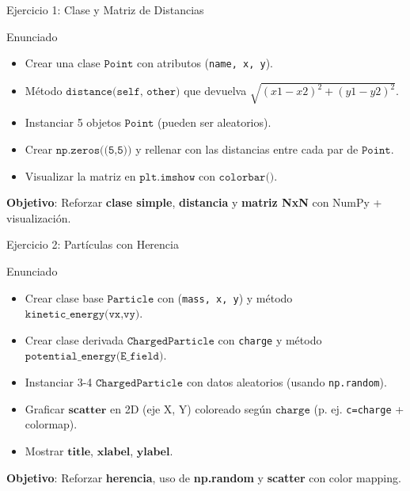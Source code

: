 \documentclass[10pt]{beamer}
\begin{document}
\begin{frame}{Ejercicio 1: Clase y Matriz de Distancias}
  \begin{block}{Enunciado}
    \begin{itemize}
      \item Crear una clase \(\texttt{Point}\) con atributos (\texttt{name, x, y}).
      \item Método \(\texttt{distance(self, other)}\) que devuelva \(\sqrt{(x1-x2)^2 + (y1-y2)^2}\).
      \item Instanciar 5 objetos \(\texttt{Point}\) (pueden ser aleatorios).
      \item Crear \(\texttt{np.zeros((5,5))}\) y rellenar con las distancias entre cada par de \(\texttt{Point}\).
      \item Visualizar la matriz en \(\texttt{plt.imshow}\) con \(\texttt{colorbar()}\).
    \end{itemize}
  \end{block}
  \textbf{Objetivo}: Reforzar \textbf{clase simple}, \textbf{distancia} y \textbf{matriz NxN} con NumPy + visualización.
\end{frame}

\begin{frame}{Ejercicio 2: Partículas con Herencia}
  \begin{block}{Enunciado}
    \begin{itemize}
      \item Crear clase base \(\texttt{Particle}\) con (\texttt{mass, x, y}) y método \(\texttt{kinetic\_energy(vx,vy)}\).
      \item Crear clase derivada \(\texttt{ChargedParticle}\) con \texttt{charge} y método \(\texttt{potential\_energy(E\_field)}\).
      \item Instanciar 3-4 \(\texttt{ChargedParticle}\) con datos aleatorios (usando \texttt{np.random}).
      \item Graficar \(\textbf{scatter}\) en 2D (eje X, Y) coloreado según \(\texttt{charge}\) (p. ej. \texttt{c=charge} + colormap).
      \item Mostrar \(\textbf{title}\), \(\textbf{xlabel}\), \(\textbf{ylabel}\).
    \end{itemize}
  \end{block}
  \textbf{Objetivo}: Reforzar \textbf{herencia}, uso de \textbf{np.random} y \textbf{scatter} con color mapping.
\end{frame}
\end{document}
